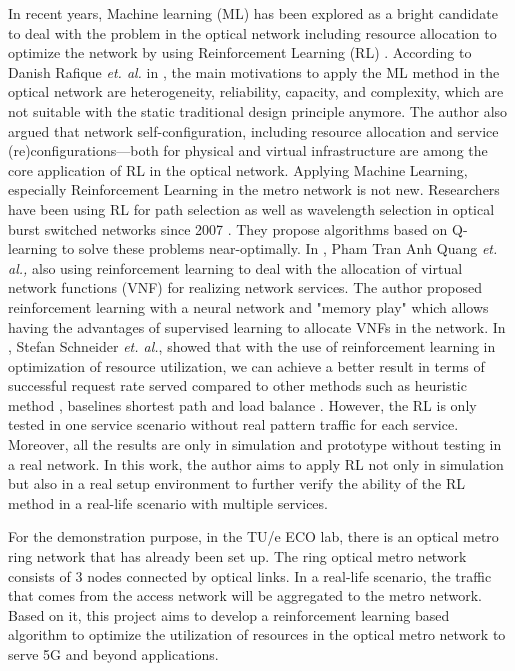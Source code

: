 \documentclass[conference]{IEEEtran}
\begin{document}
In recent years, Machine learning (ML) has been explored as a bright candidate to deal with the problem in the optical network including resource allocation to optimize the network by using Reinforcement Learning (RL) \cite{Gu2020}. According to Danish Rafique \textit{et. al.} in \cite{Rafique:18}, the main motivations to apply the ML method in the optical network are heterogeneity, reliability, capacity, and complexity, which are not suitable with the static traditional design principle anymore. The author also argued that network self-configuration, including resource allocation and service (re)configurations—both for physical and virtual infrastructure are among the core application of RL in the optical network. Applying Machine Learning, especially Reinforcement Learning in the metro network is not new. Researchers have been using RL for path selection as well as wavelength selection in optical burst switched networks since 2007 \cite{4395244}. They propose algorithms based on Q-learning to solve these problems near-optimally. In \cite{8873660}, Pham Tran Anh Quang \textit{et. al.,} also using reinforcement learning to deal with the allocation of virtual network functions (VNF) for realizing network services. The author proposed reinforcement learning with a neural network and "memory play" which allows having the advantages of supervised learning to allocate VNFs in the network. In \cite{9269087}, Stefan Schneider \textit{et. al.}, showed that with the use of reinforcement learning in optimization of resource utilization, we can achieve a better result in terms of successful request rate served compared to other methods such as heuristic method \cite{8459915}, baselines shortest path and load balance \cite{8485853}. However, the RL is only tested in one service scenario without real pattern traffic for each service. Moreover, all the results are only in simulation and prototype without testing in a real network. In this work, the author aims to apply RL not only in simulation but also in a real setup environment to further verify the ability of the RL method in a real-life scenario with multiple services.

For the demonstration purpose, in the TU/e ECO lab, there is an optical metro ring network that has already been set up. The ring optical metro network consists of 3 nodes connected by optical links. In a real-life scenario, the traffic that comes from the access network will be aggregated to the metro network. Based on it, this project aims to develop a reinforcement learning based algorithm to optimize the utilization of resources in the optical metro network to serve 5G and beyond applications.
\end{document}
